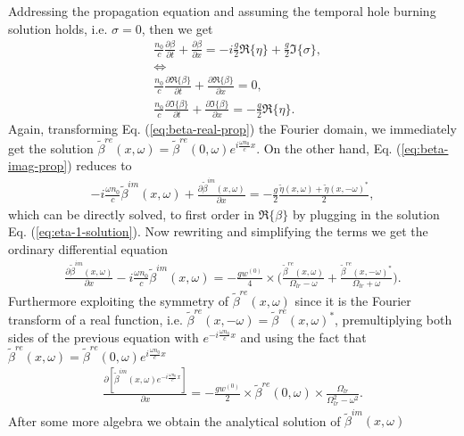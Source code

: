 \documentclass[onecolumn,secnumarabic,amssymb, nobibnotes, aip, prd]{revtex4-1}
\def\p{\partial}
\def\t{\tilde}
\def\om{\omega}
\begin{document}
\begin{appendices}
Addressing the propagation equation and assuming the temporal hole burning solution holds, i.e. $\sigma = 0$, then we get 
\begin{subequations}
\label{eq:propagation-eq2}
\begin{align}
&\frac{n_0}{c}\frac{\p \beta}{\p t} + \frac{\p \beta}{\p x} = -i\frac{g}{2}\Re\{\eta\}+\frac{g}{2}\Im\{\sigma\}, \nonumber \\
	&{\Leftrightarrow} \nonumber \\
&	\frac{n_0}{c}\frac{\p \Re\{\beta\}}{\p t} + \frac{\p \Re\{\beta\}}{\p x} = 0, \label{eq:beta-real-prop} \\
&	\frac{n_0}{c}\frac{\p \Im\{\beta\}}{\p t} + \frac{\p \Im\{\beta\}}{\p x} = -\frac{g}{2}\Re\{\eta\}. \label{eq:beta-imag-prop} 
\end{align}
\end{subequations}
Again, transforming Eq. (\ref{eq:beta-real-prop}) the Fourier domain, we immediately get the solution $\t\beta^{re}(x,\om) = \t\beta^{re}(0,\om)e^{i\frac{\om n_0}{c}x}$. On the other hand, Eq. (\ref{eq:beta-imag-prop}) reduces to 
\begin{align}
-i\frac{\om n_0}{c}\t\beta^{im}(x,\om) + \frac{\p \t\beta^{im}(x,\om)}{\p x} = -\frac{g}{2}\frac{\t\eta(x,\om)+\t\eta(x,-\om)^*}{2}, \label{eq:beta-imag-prop-fourier} 
\end{align}
which can be directly solved, to first order in $\Re\{\beta\}$ by plugging in the solution Eq. (\ref{eq:eta-1-solution}). Now rewriting and simplifying the terms we get the ordinary differential equation 
\begin{align}
\frac{\p \t\beta^{im}(x,\om)} {\p x} -i\frac{\om n_0}{c}\t\beta^{im}(x,\om)  = -\frac{g w^{(0)} }{4}\times  \big(\frac{\t\beta^{re}(x,\om)}{\Omega_{lr}-\om} + \frac{\t\beta^{re}(x,-\om)^* }{\Omega_{lr}+\om} \big).
\end{align}
Furthermore exploiting the symmetry of $\t\beta^{re}(x,\om)$ since it is the Fourier transform of a real function, i.e.  $\t\beta^{re}(x,-\om)  =  \t\beta^{re}(x,\om)^*$, premultiplying both sides of the previous equation with $e^{-i\frac{\om n_0}{c}x}$ and using the fact that $\t\beta^{re}(x,\om) = \t\beta^{re}(0,\om)e^{i\frac{\om n_0}{c}x}$
\begin{align}
\frac{\p \left [ \t\beta^{im}(x,\om)e^{-i\frac{\om n_0}{c}x} \right] } {\p x}  = -\frac{g w^{(0)} }{2}\times  \t\beta^{re}(0,\om) \times\frac{\Omega_{lr}}{\Omega_{lr}^2-\om^2}.
\end{align}
After some more algebra we obtain the analytical solution of $\t\beta^{im}(x,\om)$

\end{appendices}
\end{document}
